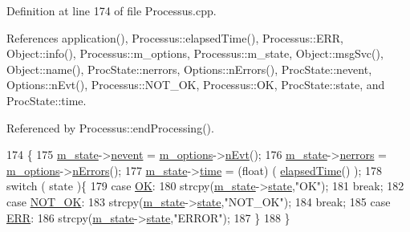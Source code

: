 Definition at line 174 of file Processus.\+cpp.



References application(), Processus\+::elapsed\+Time(), Processus\+::\+E\+RR, Object\+::info(), Processus\+::m\+\_\+options, Processus\+::m\+\_\+state, Object\+::msg\+Svc(), Object\+::name(), Proc\+State\+::nerrors, Options\+::n\+Errors(), Proc\+State\+::nevent, Options\+::n\+Evt(), Processus\+::\+N\+O\+T\+\_\+\+OK, Processus\+::\+OK, Proc\+State\+::state, and Proc\+State\+::time.



Referenced by Processus\+::end\+Processing().


\begin{DoxyCode}
174                                      \{
175   \hyperlink{classProcessus_ab3539eee42891ceae0baf4395ae7fb61}{m\_state}->\hyperlink{structProcState_a1881d6b0db849a8af15f586ad5959260}{nevent}  = \hyperlink{classProcessus_a74205f3c1e00c4448f7b3257c2351797}{m\_options}->\hyperlink{classOptions_ad769b256263a4ac24dd6f989ae724ab7}{nEvt}();
176   \hyperlink{classProcessus_ab3539eee42891ceae0baf4395ae7fb61}{m\_state}->\hyperlink{structProcState_a51a0f54ba62b07e07ac8518c5f32828d}{nerrors} = \hyperlink{classProcessus_a74205f3c1e00c4448f7b3257c2351797}{m\_options}->\hyperlink{classOptions_acc6474323f0bbe17fa844e9a086b90b8}{nErrors}();
177   \hyperlink{classProcessus_ab3539eee42891ceae0baf4395ae7fb61}{m\_state}->\hyperlink{structProcState_a88c69b099d8f2b2164d478f28e87610f}{time}    = (float) ( \hyperlink{classProcessus_aecca96218c65bc805c988cd95447df55}{elapsedTime}() );
178   \textcolor{keywordflow}{switch} ( state )\{
179   \textcolor{keywordflow}{case} \hyperlink{classProcessus_a36278773bd98f2d5612fea40c7774821af77c64124fa175f28200166fff165ea2}{OK}:
180     strcpy(\hyperlink{classProcessus_ab3539eee42891ceae0baf4395ae7fb61}{m\_state}->\hyperlink{structProcState_aaffb70e5af437e2c0d4dfc69bd0b24cd}{state},\textcolor{stringliteral}{"OK"});
181     \textcolor{keywordflow}{break};
182   \textcolor{keywordflow}{case} \hyperlink{classProcessus_a36278773bd98f2d5612fea40c7774821a629082f49d6e8df6b6da2b8fbb9d80fb}{NOT\_OK}:
183     strcpy(\hyperlink{classProcessus_ab3539eee42891ceae0baf4395ae7fb61}{m\_state}->\hyperlink{structProcState_aaffb70e5af437e2c0d4dfc69bd0b24cd}{state},\textcolor{stringliteral}{"NOT\_OK"});
184     \textcolor{keywordflow}{break};
185   \textcolor{keywordflow}{case} \hyperlink{classProcessus_a36278773bd98f2d5612fea40c7774821adaf73ad5d0a09f952d0f18dbbe1c7493}{ERR}:
186     strcpy(\hyperlink{classProcessus_ab3539eee42891ceae0baf4395ae7fb61}{m\_state}->\hyperlink{structProcState_aaffb70e5af437e2c0d4dfc69bd0b24cd}{state},\textcolor{stringliteral}{"ERROR"});
187   \}
188 \}
\end{DoxyCode}
\mbox{\label{classProcessus_ad57a29b33f9021eda9f6929136f1784f}} 

